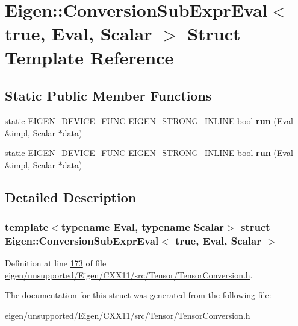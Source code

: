 \hypertarget{struct_eigen_1_1_conversion_sub_expr_eval_3_01true_00_01_eval_00_01_scalar_01_4}{}\section{Eigen\+:\+:Conversion\+Sub\+Expr\+Eval$<$ true, Eval, Scalar $>$ Struct Template Reference}
\label{struct_eigen_1_1_conversion_sub_expr_eval_3_01true_00_01_eval_00_01_scalar_01_4}
\subsection*{Static Public Member Functions}
\begin{DoxyCompactItemize}
\item 
\mbox{\label{struct_eigen_1_1_conversion_sub_expr_eval_3_01true_00_01_eval_00_01_scalar_01_4_a66c6300071992747948540ee6390b4f0}} 
static E\+I\+G\+E\+N\+\_\+\+D\+E\+V\+I\+C\+E\+\_\+\+F\+U\+NC E\+I\+G\+E\+N\+\_\+\+S\+T\+R\+O\+N\+G\+\_\+\+I\+N\+L\+I\+NE bool {\bfseries run} (Eval \&impl, Scalar $\ast$data)
\item 
\mbox{\label{struct_eigen_1_1_conversion_sub_expr_eval_3_01true_00_01_eval_00_01_scalar_01_4_a66c6300071992747948540ee6390b4f0}} 
static E\+I\+G\+E\+N\+\_\+\+D\+E\+V\+I\+C\+E\+\_\+\+F\+U\+NC E\+I\+G\+E\+N\+\_\+\+S\+T\+R\+O\+N\+G\+\_\+\+I\+N\+L\+I\+NE bool {\bfseries run} (Eval \&impl, Scalar $\ast$data)
\end{DoxyCompactItemize}


\subsection{Detailed Description}
\subsubsection*{template$<$typename Eval, typename Scalar$>$\newline
struct Eigen\+::\+Conversion\+Sub\+Expr\+Eval$<$ true, Eval, Scalar $>$}



Definition at line \hyperlink{eigen_2unsupported_2_eigen_2_c_x_x11_2src_2_tensor_2_tensor_conversion_8h_source_l00173}{173} of file \hyperlink{eigen_2unsupported_2_eigen_2_c_x_x11_2src_2_tensor_2_tensor_conversion_8h_source}{eigen/unsupported/\+Eigen/\+C\+X\+X11/src/\+Tensor/\+Tensor\+Conversion.\+h}.



The documentation for this struct was generated from the following file\+:\begin{DoxyCompactItemize}
\item 
eigen/unsupported/\+Eigen/\+C\+X\+X11/src/\+Tensor/\+Tensor\+Conversion.\+h\end{DoxyCompactItemize}
